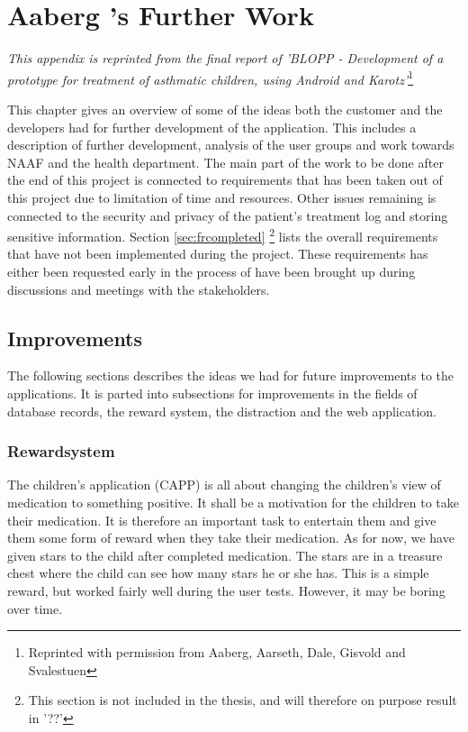 \chapter{Aaberg \etal{}'s Further Work}
\label{app:furtherWork}


\emph{This appendix is reprinted from the final report of 'BLOPP - Development of a prototype for treatment of asthmatic children, using Android and Karotz'}\footnote{Reprinted with permission from Aaberg, Aarseth, Dale, Gisvold and Svalestuen} \cite{CustomerDriven}


This chapter gives an overview of some of the ideas both the customer and the developers had for further development of the application. This includes a description of further development, analysis of the user groups and work towards NAAF and the health department.
The main part of the work to be done after the end of this project is connected to requirements that has been taken out of this project due to limitation of time and resources. Other issues remaining is connected to the security and privacy of the patient's treatment log and storing sensitive information.
Section \ref{sec:frcompleted} \footnote{This section is not included in the thesis, and will therefore on purpose result in '??'} lists the overall requirements that have not been implemented during the project. These requirements has either been requested early in the process of have been brought up during discussions and meetings with the stakeholders. 


\section{Improvements}
\label{sec:Improvements}
The following sections describes the ideas we had for future improvements to the applications. It is parted into subsections for improvements in the fields of database records, the reward system, the distraction and the web application.

%
%

\subsection{Rewardsystem}
The children's application (CAPP) is all about changing the children's view of medication to something positive. It shall be a motivation for the children to take their medication. It is therefore an important task to entertain them and give them some form of reward when they take their medication. As for now, we have given stars to the child after completed medication. The stars are in a treasure chest where the child can see how many stars he or she has. This is a simple reward, but worked fairly well during the user tests. However, it may be boring over time. 

